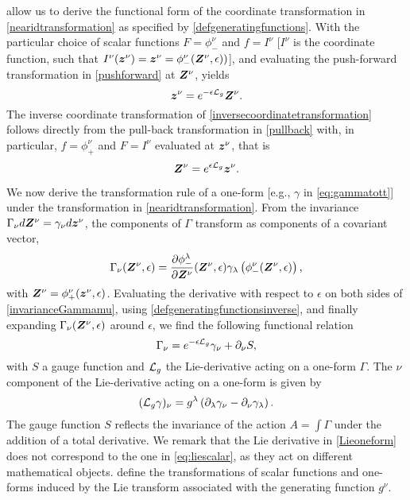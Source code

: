  allow us to derive the functional form of the coordinate transformation in \cref{nearidtransformation} as specified by \cref{defgeneratingfunctions}. With the particular choice of scalar functions $F =  \phi_-^\nu$ and $f = I^{\nu}$ [$I^{\nu}$ is the coordinate function, such that $I^\nu(\bm{z}^\nu) = \bm{z}^\nu =  \phi_-^\nu( \bm{Z}^\nu, \epsilon ))$], and evaluating the push-forward transformation in \cref{pushforward} at $ \bm{Z}^\nu$, yields
%
\begin{equation} \label{inversecoordinatetransformation}
\bm{z}^{\nu} = e^{-\epsilon\mathcal{L}_{g}}  \bm{Z}^\nu.
\end{equation}
%
The inverse coordinate transformation of \cref{inversecoordinatetransformation} follows directly from the pull-back transformation in \cref{pullback} with, in particular, $f = \phi_+^\nu$ and $F = I^\nu$ evaluated at $\bm{z}^\nu$, that is
%
\begin{equation}
     \bm{Z}^\nu = e^{\epsilon\mathcal{L}_{g}} \bm{z}^\nu.
\end{equation}

We now derive the transformation rule of a one-form [e.g., $\gamma$ in \cref{eq:gammatott}] under the transformation in \cref{nearidtransformation}. From the invariance $\Gamma_\nu d  \bm{Z}^\nu = \gamma_\nu d \bm{z}^\nu$, the components of $\Gamma$ transform as components of a covariant vector, 
%
\begin{equation} \label{invarianceGammamu}
\Gamma_\nu( \bm{Z}^\nu,\epsilon) = \frac{\partial \phi_-^\lambda }{\partial  \bm{Z}^\nu} ( \bm{Z}^\nu,\epsilon)\gamma_\lambda\left( \phi^\nu_- ( \bm{Z}^\nu , \epsilon)\right),
\end{equation}
%
with $\bm{Z}^\nu = \phi^\nu_+( \bm{z}^\nu,\epsilon)$.
%
Evaluating the derivative with respect to $\epsilon$ on both sides of \cref{invarianceGammamu}, using \cref{defgeneratingfunctionsinverse}, and finally expanding $\Gamma_\nu( \bm{Z}^\nu,\epsilon)$ around $\epsilon$, we find the following functional relation
%
\begin{equation} \label{pushforwardoneform}
\Gamma_\nu = e^{- \epsilon\mathcal{L}_{g}} \gamma_\nu  + \partial_\nu S,
\end{equation}
%
with $S$ a gauge function and $\mathcal{L}_{g}$ the Lie-derivative acting on a one-form $\Gamma$.
%
The $\nu$ component of the Lie-derivative acting on a one-form is given by
%
\begin{equation} \label{Lieoneform}
(\mathcal{L}_{g} \gamma)_\nu  = g^\lambda \left(\partial_\lambda \gamma_\nu  - \partial_\nu \gamma_\lambda \right).
\end{equation}
%
The gauge function $S$ reflects the invariance of the action ${A} = \int  \Gamma$ under the addition of a total derivative.
%
We remark that the Lie derivative in \cref{Lieoneform} does not correspond to the one in \cref{eq:liescalar}, as they act on different mathematical objects.
%
 define the transformations of scalar functions and one-forms induced by the Lie transform associated with the generating function $g^\nu$. 


